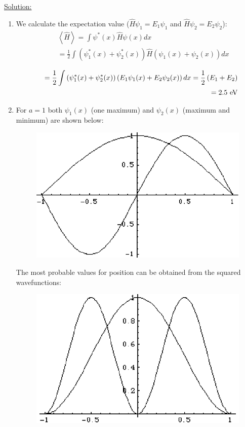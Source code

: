 \noindent
\underline{Solution:}\\
\begin{enumerate}
\item We calculate the expectation value ($\hat{H}\psi_1 = E_1\psi_1$ and $\hat{H}\psi_2 = E_2\psi_2$):
\begin{eqnarray}
\nonumber
& & \left<\hat{H}\right> = \int\psi^*(x)\hat{H}\psi(x)dx\\
\nonumber
& & = \frac{1}{2}\int\left(\psi_1^*(x) + \psi_2^*(x)\right)\hat{H}\left(\psi_1(x) + \psi_2(x)\right)dx
\end{eqnarray}

\begin{eqnarray}
\nonumber
& & = \frac{1}{2}\int\left(\psi_1^*(x) + \psi_2^*(x)\right)\left(E_1\psi_1(x) + E_2\psi_2(x)\right)dx = \frac{1}{2}\left(E_1 + E_2\right)\\
\nonumber
& & = 2.5\textnormal{ eV}
\end{eqnarray}

\item For $a = 1$ both $\psi_1(x)$ (one maximum) and $\psi_2(x)$ (maximum and minimum) are shown below:

\begin{figure}[htp!]
\centering\includegraphics[scale=0.7]{wavefun1}
\end{figure}

The most probable values for position can be obtained from the squared wavefunctions:

\begin{figure}[htp!]
\centering\includegraphics[scale=0.7]{wavefun2}
\end{figure}


\end{enumerate}
